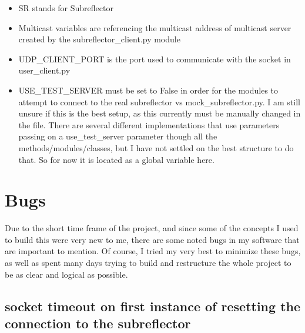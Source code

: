 \documentclass{article}
\begin{document}
\begin{itemize}
\item  SR stands for Subreflector
\item Multicast variables are referencing the multicast address of multicast server created by the subreflector\_client.py module
\item UDP\_CLIENT\_PORT is the port used to communicate with the socket in user\_client.py
\item USE\_TEST\_SERVER must be set to False in order for the modules to attempt to connect to the real subreflector vs mock\_subreflector.py. I am still unsure if this is the best setup, as this currently must be manually changed in the file. There are several different implementations that use parameters passing on a use\_test\_server parameter though all the methods/modules/classes, but I have not settled on the best structure to do that. So for now it is located as a global variable here. 
\end{itemize}










\newpage
\section{Bugs}

Due to the short time frame of the project, and since some of the concepts I used to build this were very new to me, there are some noted bugs in my software that are important to mention. Of course, I tried my very best to minimize these bugs, as well as spent many days trying to build and restructure the whole project to be as clear and logical as possible.  

\subsection{socket timeout on first instance of resetting the connection to the subreflector }
\end{document}
